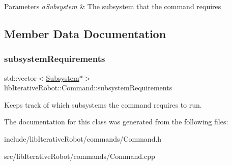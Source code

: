\begin{DoxyParams}{Parameters}
{\em a\+Subsystem} & The subsystem that the command requires \\
\hline
\end{DoxyParams}


\subsection{Member Data Documentation}
\mbox{\label{classlib_iterative_robot_1_1_command_abbedf025246921d5cde67aa954b74d35}} 
\subsubsection{\texorpdfstring{subsystemRequirements}{subsystemRequirements}}
{\footnotesize\ttfamily std\+::vector$<$\mbox{\hyperlink{classlib_iterative_robot_1_1_subsystem}{Subsystem}}$\ast$$>$ lib\+Iterative\+Robot\+::\+Command\+::subsystem\+Requirements\hspace{0.3cm}{\ttfamily [private]}}



Keeps track of which subsystems the command requires to run. 

 

The documentation for this class was generated from the following files\+:\begin{DoxyCompactItemize}
\item 
include/lib\+Iterative\+Robot/commands/Command.\+h\item 
src/lib\+Iterative\+Robot/commands/Command.\+cpp\end{DoxyCompactItemize}
